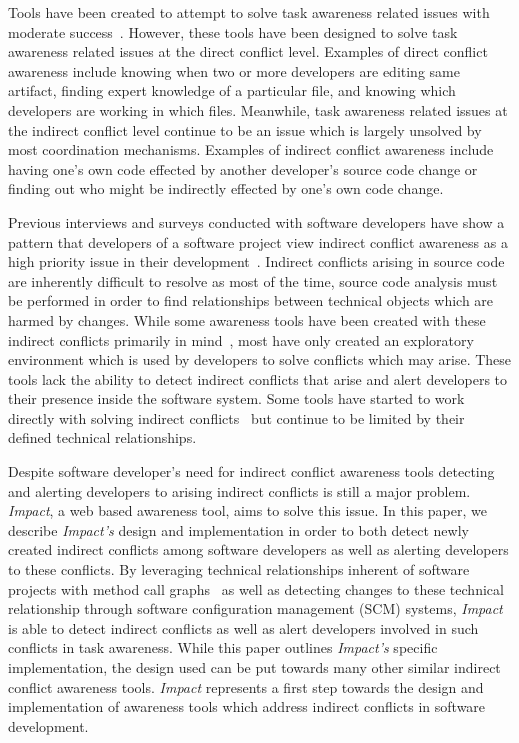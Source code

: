\documentclass[conference]{IEEEtran}
\begin{document}
Tools have been created to attempt to solve task awareness related issues
with moderate success~\cite{Xiang:2008:ERT, Biehl:2007:FVD, Sarma:2009:TIV, Khurana:2009:PFC}. However, these tools have been designed 
to solve task awareness related issues at the direct conflict level. 
Examples of direct conflict awareness include knowing when two or more 
developers are  editing same artifact, finding expert knowledge of a
particular file, and knowing which developers are working in which files.
Meanwhile, task awareness related issues at the indirect conflict level
continue to be an issue which is largely unsolved by most coordination
mechanisms. Examples of indirect conflict awareness
include having one's own code effected by another developer's source
code change or finding out who might be indirectly effected by one's
own code change. 

Previous interviews and surveys conducted with software developers have 
show a pattern that developers of a software project view indirect conflict 
awareness  as a high priority issue in their development~\cite{Damian:2007:GSE, 
Halverson:2006:DTV, Begel:2010:CDE, Schroter:2012:TTF}.
Indirect conflicts arising in source code are inherently
difficult to resolve as most of the time, source code analysis must
be performed in order to find relationships between technical objects
which are harmed by changes.
While some awareness tools have been created with these indirect conflicts
primarily in mind~\cite{Begel:2010:CDE, Trainer:2005:BGT}, most have only 
created an exploratory environment which is used by developers to
solve conflicts which may arise. These tools lack the ability to detect
indirect conflicts that arise and alert developers to their presence 
inside the software system. Some tools have started to work directly
with solving indirect conflicts~\cite{Sarma:2007:TSA} but continue
to be limited by their defined technical relationships. 

Despite software developer's need for indirect conflict awareness tools
detecting and alerting developers to arising indirect conflicts is still a major
problem. \textit{Impact}, a web based awareness
tool, aims to solve this issue. In this paper, we describe \textit{Impact's}
design and implementation in order to both detect newly created
indirect conflicts among software developers as well as alerting developers
to these conflicts. By leveraging technical relationships inherent of 
software projects with method call graphs~\cite{Lakhotia:1993:CCM}
as well as detecting changes
to these technical relationship through software configuration management
(SCM) systems, \textit{Impact} is able to detect indirect conflicts as well as
alert developers involved in such conflicts in task awareness. While this paper
outlines \textit{Impact's} specific implementation, the design used can be put
towards many other similar indirect conflict awareness tools. 
\textit{Impact} represents a first step towards the design and implementation
of awareness tools which address indirect conflicts in software development.
\end{document}
